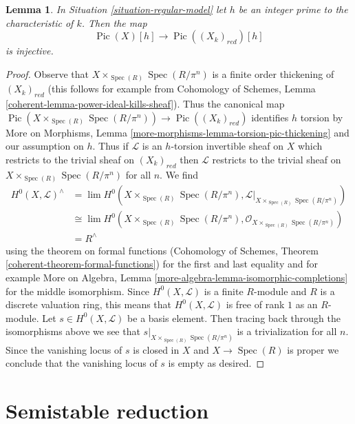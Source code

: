 \documentclass{stacks-project}
\theoremstyle{plain}
\newtheorem{lemma}[subsection]{Lemma}
\theoremstyle{definition}
\theoremstyle{remark}
\numberwithin{equation}{subsection}
\def\lim{\mathop{\mathrm{lim}}\nolimits}
\def\Spec{\mathop{\mathrm{Spec}}}
\def\Pic{\mathop{\mathrm{Pic}}\nolimits}
\begin{document}
\begin{lemma}
\label{lemma-torsion-embeds}
In Situation \ref{situation-regular-model} let $h$ be an integer
prime to the characteristic of $k$. Then the map
$$
\Pic(X)[h] \longrightarrow \Pic((X_k)_{red})[h]
$$
is injective.
\end{lemma}

\begin{proof}
Observe that $X \times_{\Spec(R)} \Spec(R/\pi^n)$ is a finite
order thickening of $(X_k)_{red}$ (this follows for example from
Cohomology of Schemes, Lemma \ref{coherent-lemma-power-ideal-kills-sheaf}).
Thus the canonical map
$\Pic(X \times_{\Spec(R)} \Spec(R/\pi^n)) \to \Pic((X_k)_{red})$
identifies $h$ torsion by
More on Morphisms, Lemma \ref{more-morphisms-lemma-torsion-pic-thickening}
and our assumption on $h$.
Thus if $\mathcal{L}$ is an $h$-torsion invertible sheaf on $X$
which restricts to the trivial sheaf on $(X_k)_{red}$ then
$\mathcal{L}$ restricts to the trivial sheaf on
$X \times_{\Spec(R)} \Spec(R/\pi^n)$ for all $n$.
We find
\begin{align*}
H^0(X, \mathcal{L})^\wedge
& =
\lim H^0(X \times_{\Spec(R)} \Spec(R/\pi^n),
\mathcal{L}|_{X \times_{\Spec(R)} \Spec(R/\pi^n)}) \\
& \cong
\lim H^0(X \times_{\Spec(R)} \Spec(R/\pi^n),
\mathcal{O}_{X \times_{\Spec(R)} \Spec(R/\pi^n)}) \\
& =
R^\wedge
\end{align*}
using the theorem on formal functions
(Cohomology of Schemes, Theorem \ref{coherent-theorem-formal-functions})
for the first and last equality and for example
More on Algebra, Lemma \ref{more-algebra-lemma-isomorphic-completions}
for the middle isomorphism. Since $H^0(X, \mathcal{L})$ is a finite
$R$-module and $R$ is a discrete valuation ring, this means that
$H^0(X, \mathcal{L})$ is free of rank $1$ as an $R$-module.
Let $s \in H^0(X, \mathcal{L})$ be a basis element.
Then tracing back through the isomorphisms above we see
that $s|_{X \times_{\Spec(R)} \Spec(R/\pi^n)}$ is a trivialization
for all $n$. Since the vanishing locus of $s$ is closed in $X$
and $X \to \Spec(R)$ is proper we conclude that the vanishing
locus of $s$ is empty as desired.
\end{proof}






\section{Semistable reduction}
\label{section-semistable-reduction}
\end{document}
